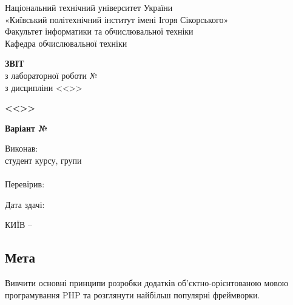 \documentclass[14pt, a4paper]{extreport}
\begin{document}
	
	\begin{titlepage}
		\begin{center}
			\normalsize
			Національний технічний університет України\\
			«Київський політехнічний інститут імені Ігоря Сікорського» \\[0.5em]
			Факультет інформатики та обчислювальної техніки\\
			Кафедра обчислювальної техніки
			
			\vfill
			
			{\large \textbf{ЗВІТ}\\[0.5em]}
			{з лабораторної роботи №\LabNumber \\}
			{з дисципліни <<\CourseTitle>>}
			
			\vspace{2em}
			
			{\textbf{<<\Topic>>}}
			
			\vspace{1em}
			
			{\textbf{Варіант №\Variant}}
			
			\vfill
			
			\begin{flushright}
				Виконав: \\ студент \CourseNumber{} курсу, групи \StudentGroup \\
				\StudentName \\[1em]
				Перевірив: \\ \Teacher
			\end{flushright}
			
			\vfill
			
			\begin{flushright}
				Дата здачі: \DTMtoday
			\end{flushright}
			
			\vspace{5em}
			КИЇВ -- \ReportYear
		\end{center}
	\end{titlepage}
	
	\clearpage
	\setcounter{page}{2}
	
	\subsection*{Мета} 
	
	Вивчити основні принципи розробки додатків об'єктно-орієнтованою мовою програмування PHP та розглянути найбільш популярні фреймворки.
	
\end{document}
